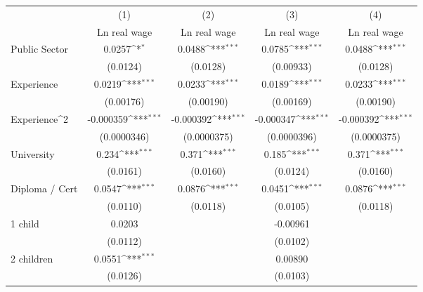 {
\def\sym#1{\ifmmode^{#1}\else\(^{#1}\)\fi}
\begin{tabular}{l*{4}{c}}
\hline\hline
                    &\multicolumn{1}{c}{(1)}&\multicolumn{1}{c}{(2)}&\multicolumn{1}{c}{(3)}&\multicolumn{1}{c}{(4)}\\
                    &\multicolumn{1}{c}{Ln real wage}&\multicolumn{1}{c}{Ln real wage}&\multicolumn{1}{c}{Ln real wage}&\multicolumn{1}{c}{Ln real wage}\\
\hline
Public Sector       &      0.0257\sym{*}  &      0.0488\sym{***}&      0.0785\sym{***}&      0.0488\sym{***}\\
                    &    (0.0124)         &    (0.0128)         &   (0.00933)         &    (0.0128)         \\
[1em]
Experience          &      0.0219\sym{***}&      0.0233\sym{***}&      0.0189\sym{***}&      0.0233\sym{***}\\
                    &   (0.00176)         &   (0.00190)         &   (0.00169)         &   (0.00190)         \\
[1em]
Experience^{2}      &   -0.000359\sym{***}&   -0.000392\sym{***}&   -0.000347\sym{***}&   -0.000392\sym{***}\\
                    & (0.0000346)         & (0.0000375)         & (0.0000396)         & (0.0000375)         \\
[1em]
University          &       0.234\sym{***}&       0.371\sym{***}&       0.185\sym{***}&       0.371\sym{***}\\
                    &    (0.0161)         &    (0.0160)         &    (0.0124)         &    (0.0160)         \\
[1em]
Diploma / Cert      &      0.0547\sym{***}&      0.0876\sym{***}&      0.0451\sym{***}&      0.0876\sym{***}\\
                    &    (0.0110)         &    (0.0118)         &    (0.0105)         &    (0.0118)         \\
[1em]
1 child             &      0.0203         &                     &    -0.00961         &                     \\
                    &    (0.0112)         &                     &    (0.0102)         &                     \\
[1em]
2 children          &      0.0551\sym{***}&                     &     0.00890         &                     \\
                    &    (0.0126)         &                     &    (0.0103)         &                     \\

\end{tabular}}
